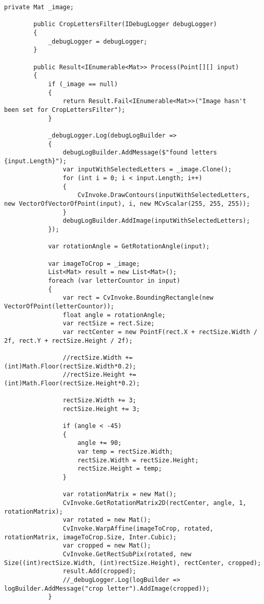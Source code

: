 \begin{lstlisting}[style=fsharpstyle,caption={Исходный код}, label=lst:recognition_result_handler]
        private Mat _image;

        public CropLettersFilter(IDebugLogger debugLogger)
        {
            _debugLogger = debugLogger;
        }

        public Result<IEnumerable<Mat>> Process(Point[][] input)
        {
            if (_image == null)
            {
                return Result.Fail<IEnumerable<Mat>>("Image hasn't been set for CropLettersFilter");
            }

            _debugLogger.Log(debugLogBuilder =>
            {
                debugLogBuilder.AddMessage($"found letters {input.Length}");
                var inputWithSelectedLetters = _image.Clone();
                for (int i = 0; i < input.Length; i++)
                {
                    CvInvoke.DrawContours(inputWithSelectedLetters, new VectorOfVectorOfPoint(input), i, new MCvScalar(255, 255, 255));
                }
                debugLogBuilder.AddImage(inputWithSelectedLetters);
            });

            var rotationAngle = GetRotationAngle(input);

            var imageToCrop = _image;
            List<Mat> result = new List<Mat>();
            foreach (var letterCountor in input)
            {
                var rect = CvInvoke.BoundingRectangle(new VectorOfPoint(letterCountor));
                float angle = rotationAngle;
                var rectSize = rect.Size;
                var rectCenter = new PointF(rect.X + rectSize.Width / 2f, rect.Y + rectSize.Height / 2f);

                //rectSize.Width += (int)Math.Floor(rectSize.Width*0.2);
                //rectSize.Height += (int)Math.Floor(rectSize.Height*0.2);

                rectSize.Width += 3;
                rectSize.Height += 3;

                if (angle < -45)
                {
                    angle += 90;
                    var temp = rectSize.Width;
                    rectSize.Width = rectSize.Height;
                    rectSize.Height = temp;
                }

                var rotationMatrix = new Mat();
                CvInvoke.GetRotationMatrix2D(rectCenter, angle, 1, rotationMatrix);
                var rotated = new Mat();
                CvInvoke.WarpAffine(imageToCrop, rotated, rotationMatrix, imageToCrop.Size, Inter.Cubic);
                var cropped = new Mat();
                CvInvoke.GetRectSubPix(rotated, new Size((int)rectSize.Width, (int)rectSize.Height), rectCenter, cropped);
                result.Add(cropped);
                //_debugLogger.Log(logBuilder => logBuilder.AddMessage("crop letter").AddImage(cropped));
            }


\end{lstlisting}
